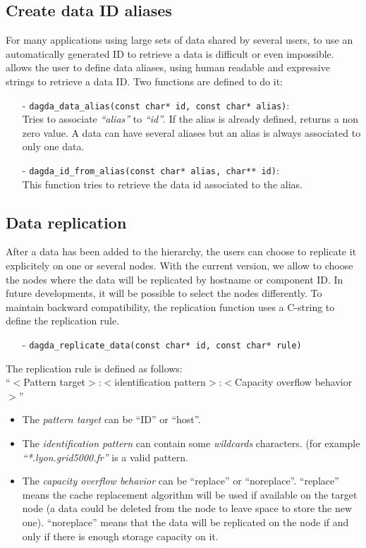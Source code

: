 \subsection{Create data ID aliases}
For many applications using large sets of data shared by several
users, to use an automatically generated ID to retrieve a data is
difficult or even impossible. \dagda allows the user to define data
aliases, using human readable and expressive strings to retrieve a
data ID. Two functions are defined to do it:
\begin{itemize}
\item[-]
  \verb#dagda_data_alias(const char* id, const char* alias)#:\\ Tries
  to associate \textit{``alias''} to \textit{``id''}. If the alias is
  already defined, returns a non zero value. A data can have several
  aliases but an alias is always associated to only one data.
\item[-]
  \verb#dagda_id_from_alias(const char* alias, char** id)#:\\ This
  function tries to retrieve the data id associated to the alias.
\end{itemize}

\subsection{Data replication}
After a data has been added to the \dagda hierarchy, the users can
choose to replicate it explicitely on one or several \diet nodes. With
the current \dagda version, we allow to choose the nodes where the
data will be replicated by hostname or \dagda component ID. In future
developments, it will be possible to select the nodes differently. To
maintain backward compatibility, the replication function uses a
C-string to define the replication rule.
\begin{itemize}
\item[-] \verb#dagda_replicate_data(const char* id, const char* rule)#
\end{itemize}
The replication rule is defined as follows:\\
``$<$Pattern target$>$:$<$identification pattern$>$:$<$Capacity overflow
behavior$>$''\\
\begin{itemize}
\item The \textit{pattern target} can be ``ID'' or ``host''.
\item The \textit{identification pattern} can contain some
  \textit{wildcards} characters. (for example
  \textit{``*.lyon.grid5000.fr''} is a valid pattern.
\item The \textit{capacity overflow behavior} can be ``replace'' or
  ``noreplace''.  ``replace'' means the cache replacement algorithm will
  be used if available on the target node (a data could be deleted
  from the node to leave space to store the new one). ``noreplace''
  means that the data will be replicated on the node if and only if
  there is enough storage capacity on it.
\end{itemize}

